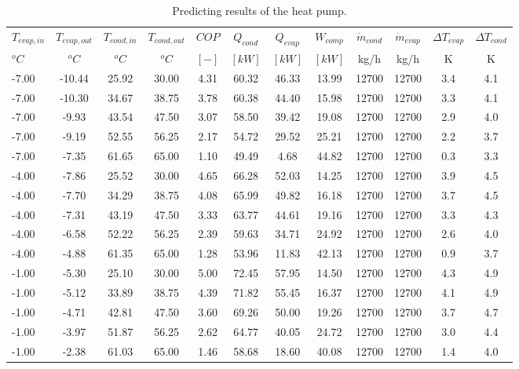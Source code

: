 \documentclass[english]{SPFShortReport}
\begin{document}
\begin{table}[!ht]
\begin{small}
\caption{Predicting results of the heat pump.}
\begin{center}
\resizebox{12cm}{!} 
{
\begin{tabular}{l | c c c c c c c c c c c } 
\hline
\hline
$T_{evap,in}$ &$T_{evap,out}$ &$T_{cond,in}$ &$T_{cond,out}$ &$COP$ &$Q_{cond}$ &$Q_{evap}$ &$W_{comp}$ &$\dot m_{cond}$ &$\dot m_{evap}$ &$\Delta T_{evap}$ &$\Delta T_{cond}$ \\ 
$^oC$ &$^oC$ &$^oC$ &$^oC$ &$[-]$ &$[kW]$ &$[kW]$ &$[kW]$ &kg/h &kg/h &K &K\\ 
\hline
-7.00 & -10.44 & 25.92 & 30.00 & 4.31 & 60.32 & 46.33 & 13.99 & 12700 & 12700 & 3.4 & 4.1\\ 
-7.00 & -10.30 & 34.67 & 38.75 & 3.78 & 60.38 & 44.40 & 15.98 & 12700 & 12700 & 3.3 & 4.1\\ 
-7.00 & -9.93 & 43.54 & 47.50 & 3.07 & 58.50 & 39.42 & 19.08 & 12700 & 12700 & 2.9 & 4.0\\ 
-7.00 & -9.19 & 52.55 & 56.25 & 2.17 & 54.72 & 29.52 & 25.21 & 12700 & 12700 & 2.2 & 3.7\\ 
-7.00 & -7.35 & 61.65 & 65.00 & 1.10 & 49.49 & 4.68 & 44.82 & 12700 & 12700 & 0.3 & 3.3\\ 
-4.00 & -7.86 & 25.52 & 30.00 & 4.65 & 66.28 & 52.03 & 14.25 & 12700 & 12700 & 3.9 & 4.5\\ 
-4.00 & -7.70 & 34.29 & 38.75 & 4.08 & 65.99 & 49.82 & 16.18 & 12700 & 12700 & 3.7 & 4.5\\ 
-4.00 & -7.31 & 43.19 & 47.50 & 3.33 & 63.77 & 44.61 & 19.16 & 12700 & 12700 & 3.3 & 4.3\\ 
-4.00 & -6.58 & 52.22 & 56.25 & 2.39 & 59.63 & 34.71 & 24.92 & 12700 & 12700 & 2.6 & 4.0\\ 
-4.00 & -4.88 & 61.35 & 65.00 & 1.28 & 53.96 & 11.83 & 42.13 & 12700 & 12700 & 0.9 & 3.7\\ 
-1.00 & -5.30 & 25.10 & 30.00 & 5.00 & 72.45 & 57.95 & 14.50 & 12700 & 12700 & 4.3 & 4.9\\ 
-1.00 & -5.12 & 33.89 & 38.75 & 4.39 & 71.82 & 55.45 & 16.37 & 12700 & 12700 & 4.1 & 4.9\\ 
-1.00 & -4.71 & 42.81 & 47.50 & 3.60 & 69.26 & 50.00 & 19.26 & 12700 & 12700 & 3.7 & 4.7\\ 
-1.00 & -3.97 & 51.87 & 56.25 & 2.62 & 64.77 & 40.05 & 24.72 & 12700 & 12700 & 3.0 & 4.4\\ 
-1.00 & -2.38 & 61.03 & 65.00 & 1.46 & 58.68 & 18.60 & 40.08 & 12700 & 12700 & 1.4 & 4.0\\ 

\end{tabular}}
\end{center}
\end{small}
\end{table}
\end{document}
